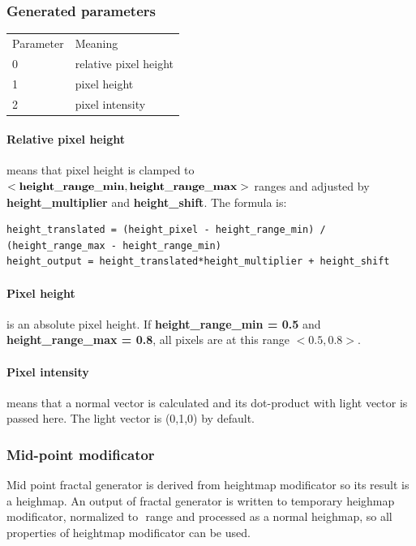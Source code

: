 \documentclass[9pt]{article}
\begin{document}
\subsubsection*{Generated parameters}
\begin{tabular}{|l||l|}
  Parameter & Meaning \\
  0 & relative pixel height \\
  1 & pixel height \\
  2 & pixel intensity \\
\end{tabular}

\paragraph*{Relative pixel height}
means that pixel height is clamped to \begin{math}{\bf<height\_range\_min, height\_range\_max>}\end{math}
ranges and adjusted by {\bf height\_multiplier} and {\bf height\_shift}.
The formula is:
\begin{verbatim}
height_translated = (height_pixel - height_range_min) / (height_range_max - height_range_min)
height_output = height_translated*height_multiplier + height_shift
\end{verbatim}

\paragraph*{Pixel height} is an absolute pixel height. 
If {\bf height\_range\_min = 0.5} and {\bf height\_range\_max = 0.8},
all pixels are at this range \begin{math}<0.5,0.8>\end{math}.

\paragraph*{Pixel intensity} means that a normal vector is 
calculated and its dot-product with light vector 
is passed here. The light vector is (0,1,0) by default.

\subsubsection{Mid-point modificator}

Mid point fractal generator is derived from heightmap modificator
so its result is a heighmap. An output of fractal generator is written to 
temporary heighmap modificator, normalized to \begin{math}<0,1>\end{math} 
range and processed as a normal heighmap, so all properties of heightmap 
modificator can be used.
\end{document}
